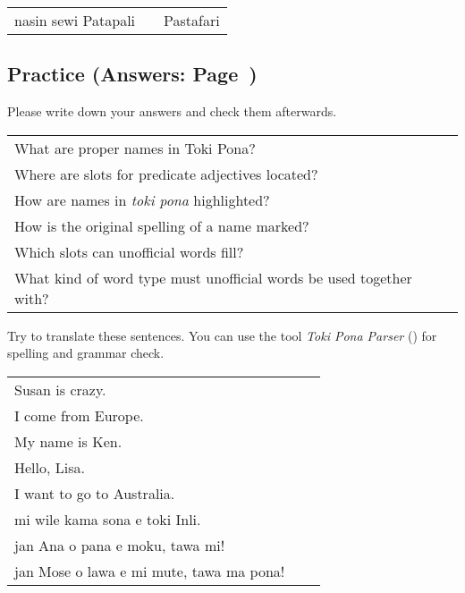 \begin{supertabular}{p{5,5cm}|ll}
    nasin sewi Patapali &  & Pastafari \\
\end{supertabular}

%
%
%
%
\newpage
\subsection*{Practice (Answers: Page~\pageref{'unofficial_words_answers'})}
%
Please write down your answers and check them afterwards.

\begin{supertabular}{p{5,5cm}|ll}
    What are proper names in Toki Pona?                                 &  & \\ %
    Where are slots for predicate adjectives located?                   &  & \\ %
    How are names in \textit{toki pona} highlighted?                    &  & \\ %
    How is the original spelling of a name marked?                      &  & \\ %
    Which slots can unofficial words fill?                              &  & \\ %
    What kind of word type must unofficial words be used together with? &  & \\ %
\end{supertabular}

Try to translate these sentences.
You can use the tool \textit{Toki Pona Parser} (\cite{www:rowa:02}) for spelling and grammar check.

\begin{supertabular}{p{5,5cm}|ll}
    Susan is crazy.                          &  & \\ %
    I come from Europe.                      &  & \\ %
    My name is Ken.                          &  & \\ %
    Hello, Lisa.                             &  & \\ %
    I want to go to Australia.               &  & \\ %
    mi wile kama sona e toki Inli.           &  & \\ %
    jan Ana o pana e moku, tawa mi!          &  & \\ %
    jan Mose o lawa e mi mute, tawa ma pona! &  & \\ %
\end{supertabular}

%
